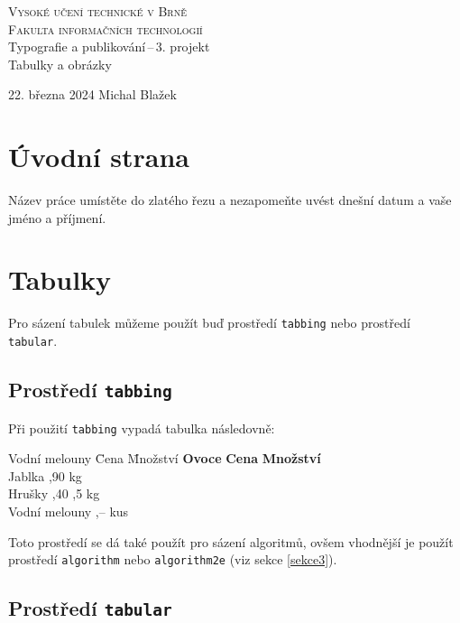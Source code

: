 \documentclass[a4paper, 11pt]{article}
\begin{document}
\begin{titlepage}
\begin{center}
    \Huge
    \textsc{Vysoké učení technické v Brně\\
    \huge{Fakulta informačních technologií}}\\
    \LARGE{Typografie a publikování\,--\,3. projekt}\\
    \Huge{Tabulky a obrázky}\\
\end{center}
{\Large 22. března 2024 \hfill Michal Blažek}
\end{titlepage}

\section{Úvodní strana}

Název práce umístěte do zlatého řezu a nezapomeňte uvést dnešní datum a vaše jméno a příjmení.

\section{Tabulky}

Pro sázení tabulek můžeme použít buď prostředí \texttt{tabbing} nebo prostředí \texttt{tabular}.

\subsection{Prostředí \texttt{tabbing}}

Při použití \texttt{tabbing} vypadá tabulka následovně:

\begin{tabbing}
    Vodní melouny \quad \= Cena \quad \= Množství \kill
    \textbf{Ovoce} \> \textbf{Cena} \> \textbf{Množství} \\
    Jablka ,90  kg \\
    Hrušky ,40 ,5 kg \\
    Vodní melouny ,--  kus \\
\end{tabbing}
Toto prostředí se dá také použít pro sázení algoritmů, ovšem vhodnější je použít prostředí \texttt{algorithm} nebo \texttt{algorithm2e} (viz sekce \ref{sekce3}).

\subsection{Prostředí \texttt{tabular}}
\end{document}
